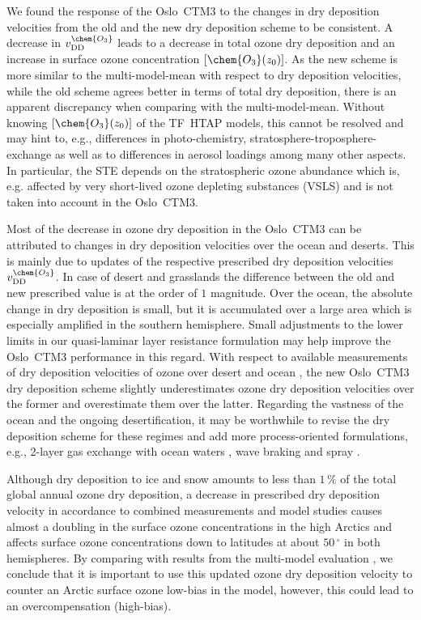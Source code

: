 \documentclass[gmd, manuscript]{copernicus}
\begin{document}
We found the response of the Oslo~CTM3 to the changes in dry deposition velocities from the old and the new dry deposition scheme to be consistent. A decrease in $v_\text{DD}^\chem{O_3}$ leads to a decrease in total ozone dry deposition and an increase in surface ozone concentration $[\chem{O_3}(z_0)]$. As the new scheme is more similar to the multi-model-mean \citep{ACP:Hardacre2015} with respect to dry deposition velocities, while the old scheme agrees better in terms of total dry deposition, there is an apparent discrepancy when comparing with the multi-model-mean. Without knowing $[\chem{O_3}(z_0)]$ of the TF~HTAP models, this cannot be resolved and may hint to, e.g., differences in photo-chemistry, stratosphere-troposphere-exchange as well as to differences in aerosol loadings among many other aspects. In particular, the STE depends on the stratospheric ozone abundance which is, e.g. affected by very short-lived ozone depleting substances (VSLS) \citep{JGR:Warwick2006, ACP:Ziska2013, ACP:Hossaini2016, ACP:Falk2017} and is not taken into account in the Oslo~CTM3.

Most of the decrease in ozone dry deposition in the Oslo~CTM3 can be attributed to changes in dry deposition velocities over the ocean and deserts. This is mainly due to updates of the respective prescribed dry deposition velocities $v_\text{DD}^\chem{O_3}$. In case of desert and grasslands the difference between the old and new prescribed value is at the order of $1$ magnitude. Over the ocean, the absolute change in dry deposition is small, but it is accumulated over a large area which is especially amplified in the southern hemisphere. Small adjustments to the lower limits in our quasi-laminar layer resistance formulation may help improve the Oslo~CTM3 performance in this regard. With respect to available measurements of dry deposition velocities of ozone over desert \citep{AE:Gusten1995} and ocean \citep{JGR:Helmig2012}, the new Oslo~CTM3 dry deposition scheme slightly underestimates ozone dry deposition velocities over the former and overestimate them over the latter. Regarding the vastness of the ocean and the ongoing desertification, it may be worthwhile to revise the dry deposition scheme for these regimes and add more process-oriented formulations, e.g., 2-layer gas exchange with ocean waters \citep{ACP:Luhar2017, ACP:Luhar2018}, wave braking and spray \citep{ACP:Pozzer2006}.

Although dry deposition to ice and snow amounts to less than $1\,\unit{\%}$ of the total global annual ozone dry deposition, a decrease in prescribed dry deposition velocity in accordance to combined measurements and model studies \citep{ACP:Helmig2007} causes almost a doubling in the surface ozone concentrations in the high Arctics and affects surface ozone concentrations down to latitudes at about $50\,\unit{^\circ}$ in both hemispheres. By comparing with results from the multi-model evaluation \citep{ACP:Hardacre2015}, we conclude that it is important to use this updated ozone dry deposition velocity to counter an Arctic surface ozone low-bias in the model, however, this could lead to an overcompensation (high-bias).
\end{document}
